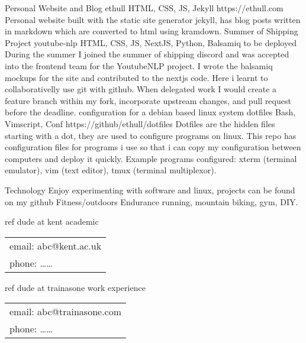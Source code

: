 \documentclass[]{awesome-cv}
\begin{document}
\vspace{-7mm}
\begin{cventries}
	\cventry
	{Personal Website and Blog}
	{ethull}
	{HTML, CSS, JS, Jekyll}
	{https://ethull.com}
	{Personal website built with the static site generator jekyll, has blog posts written in markdown which are converted to html using kramdown.}
	\cventry
	{Summer of Shipping Project}
	{youtube-nlp}
	{HTML, CSS, JS, NextJS, Python, Balsamiq}
	{to be deployed}
	{During the summer I joined the summer of shipping discord and was accepted into the frontend team for the YoutubeNLP project. I wrote the balsamiq mockups for the site and contributed to the nextjs code. Here i learnt to collaborativelly use git with github. When delegated work I would create a feature branch within my fork, incorporate upstream changes, and pull request before the deadline.}
	\cventry
	{configuration for a debian based linux system}
	{dotfiles}
	{Bash, Vimscript, Conf}
	{https://github/ethull/dotfiles}
    {Dotfiles are the hidden files starting with a dot, they are used to configure programs on linux. This repo has configuration files for programs i use so that i can copy my configuration between computers and deploy it quickly. Example programs configured: xterm (terminal emulator), vim (text editor), tmux (terminal multiplexor).}
	
	\vspace{-3mm}
\end{cventries}


\begin{cventries}
	\cventry
	{Technology}
	{}
	{}
	{}
    {Enjoy experimenting with software and linux, projects can be found on my github}
	\cventry
	{Fitness/outdoors}
	{}
	{}
	{}
    {Endurance running, mountain biking, gym, DIY.}
    
    
\end{cventries}

\begin{cventries}
	\cventry
	{ref dude at kent}
	{academic}
	{}
	{}
    {\begin{tabular}{p{}}
    email: abc@kent.ac.uk \\ phone: \ldots \ldots
    \end{tabular}}
	\cventry
	{ref dude at trainasone}
	{work experience}
	{}
	{}
    {\begin{tabular}{p{}}
        email: abc@trainasone.com \\ phone: \ldots \ldots
    \end{tabular}}
\end{cventries}

\ 
\end{document}
